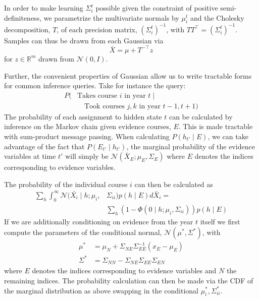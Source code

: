 \documentclass{edm_template}
\begin{document}
In order to make learning $\Sigma^t_i$ possible given the constraint of positive semi-definiteness, we parametrize the multivariate normals by $\mu_i^t$ and the Cholesky decomposition, $T$, of each precision matrix, $(\Sigma^t_i)^{-1}$, with $TT^\top = (\Sigma^t_i)^{-1}$. Samples can thus be drawn from each Gaussian via 
$$\bar{X} = \mu + T^{-\top} z$$ 
for $z \in \mathbb{R}^m$ drawn from $\mathcal{N}(0,I)$. 

Further, the convenient properties of Gaussian allow us to write tractable forms for common inference queries. Take for instance the query:
\begin{align*}
    P(&\text{Takes course } i \text{ in year } t \mid \\
                        & \quad \text{Took courses } j,k \text { in year } t-1,t+1)
\end{align*}
The probability of each assignment to hidden state $t$ can be calculated by inference on the Markov chain given evidence courses, $E$. This is made tractable with sum-product message passing. When calculating $P(h_{t'} \mid E)$, we can take advantage of the fact that $P(E_{t'} \mid h_{t'})$, the marginal probability of the evidence variables at time $t'$ will simply be $\mathcal{N}(\bar{X}_E;\mu_E,\Sigma_E)$ where $E$ denotes the indices corresponding to evidence variables. 

The probability of the individual course $i$ can then be calculated as 
\begin{align*}
\sum_h \int_0^{\infty} \mathcal{N}(\bar{X_i} \mid h; \mu_i,&\Sigma_{ii}) p(h \mid E) d\bar{X}_i = \\
&\sum_h (1 - \Phi(0 \mid h ; \mu_i,\Sigma_{ii})) p(h \mid E)
\end{align*}
If we are additionally conditioning on evidence from the year $t$ itself we first compute the parameters of the conditional normal, $\mathcal{N}(\mu^*, \Sigma^*)$, with 
\begin{align*}
\mu^* &= \mu_{N} + \Sigma_{N E} \Sigma_{E E}^{-1} (x_E - \mu_E) \\
\Sigma^* &= \Sigma_{N N} - \Sigma_{N E} \Sigma_{E E} \Sigma_{E N}
\end{align*}
where $E$ denotes the indices corresponding to evidence variables and $N$ the remaining indices. The probability calculation can then be made via the CDF of the marginal distribution as above swapping in the conditional $\mu_i^*, \Sigma_{ii}^*$.
\end{document}
